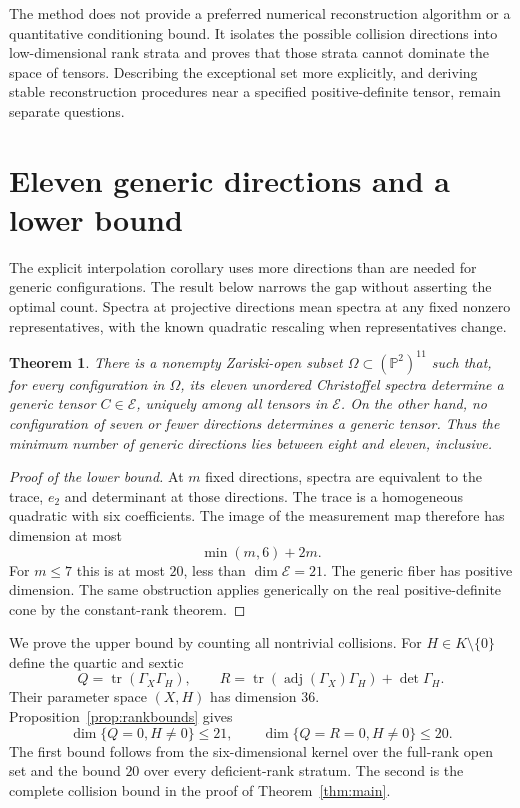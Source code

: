 \documentclass[11pt]{amsart}
\newtheorem{theorem}{Theorem}[section]
\theoremstyle{remark}
\newcommand{\PP}{\mathbb P}
\newcommand{\E}{\mathcal E}
\newcommand{\tr}{\operatorname{tr}}
\newcommand{\adj}{\operatorname{adj}}
\begin{document}
The method does not provide a preferred numerical reconstruction algorithm or a quantitative conditioning bound. It isolates the possible collision directions into low-dimensional rank strata and proves that those strata cannot dominate the space of tensors. Describing the exceptional set more explicitly, and deriving stable reconstruction procedures near a specified positive-definite tensor, remain separate questions.

\section{Eleven generic directions and a lower bound}\label{sec:finite}

The explicit interpolation corollary uses more directions than are needed for generic configurations. The result below narrows the gap without asserting the optimal count. Spectra at projective directions mean spectra at any fixed nonzero representatives, with the known quadratic rescaling when representatives change.

\begin{theorem}\label{thm:eleven}
There is a nonempty Zariski-open subset $\Omega\subset(\PP^2)^{11}$ such that, for every configuration in $\Omega$, its eleven unordered Christoffel spectra determine a generic tensor $C\in\E$, uniquely among all tensors in $\E$. On the other hand, no configuration of seven or fewer directions determines a generic tensor. Thus the minimum number of generic directions lies between eight and eleven, inclusive.
\end{theorem}

\begin{proof}[Proof of the lower bound]
At $m$ fixed directions, spectra are equivalent to the trace, $e_2$ and determinant at those directions. The trace is a homogeneous quadratic with six coefficients. The image of the measurement map therefore has dimension at most
\[
 \min(m,6)+2m.
\]
For $m\leq7$ this is at most $20$, less than $\dim\E=21$. The generic fiber has positive dimension. The same obstruction applies generically on the real positive-definite cone by the constant-rank theorem.
\end{proof}

We prove the upper bound by counting all nontrivial collisions. For $H\in K\setminus\{0\}$ define the quartic and sextic
\[
 Q=\tr(\Gamma_X\Gamma_H),\qquad
 R=\tr(\adj(\Gamma_X)\Gamma_H)+\det\Gamma_H.
\]
Their parameter space $(X,H)$ has dimension $36$. Proposition~\ref{prop:rankbounds} gives
\begin{equation}\label{eq:zeroQbounds}
 \dim\{Q=0,H\ne0\}\leq21,\qquad
 \dim\{Q=R=0,H\ne0\}\leq20.
\end{equation}
The first bound follows from the six-dimensional kernel over the full-rank open set and the bound $20$ over every deficient-rank stratum. The second is the complete collision bound in the proof of Theorem~\ref{thm:main}.
\end{document}
